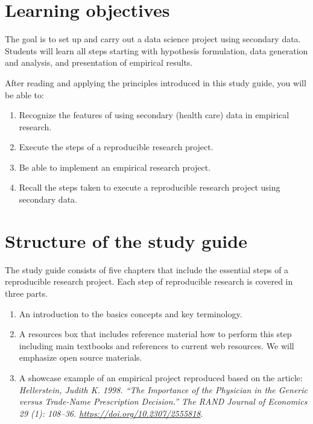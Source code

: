 \documentclass[
]{book}
\providecommand{\tightlist}{%
  \setlength{\itemsep}{0pt}\setlength{\parskip}{0pt}}
\begin{document}
\hypertarget{learning-objectives}{%
\section*{Learning objectives}\label{learning-objectives}}

The goal is to set up and carry out a data science project using
secondary data. Students will learn all steps starting with hypothesis
formulation, data generation and analysis, and presentation of empirical
results.

After reading and applying the principles introduced in this study
guide, you will be able to:

\begin{enumerate}
\def\labelenumi{\arabic{enumi}.}
\tightlist
\item
  Recognize the features of using secondary (health care) data in
  empirical research.
\item
  Execute the steps of a reproducible research project.
\item
  Be able to implement an empirical research project.
\item
  Recall the steps taken to execute a reproducible research project
  using secondary data.
\end{enumerate}

\hypertarget{structure-of-the-study-guide}{%
\section*{Structure of the study
guide}\label{structure-of-the-study-guide}}

The study guide consists of five chapters that include the essential
steps of a reproducible research project. Each step of reproducible
research is covered in three parts.

\begin{enumerate}
\def\labelenumi{\arabic{enumi}.}
\tightlist
\item
  An introduction to the basics concepts and key terminology.
\item
  A resources box that includes reference material how to perform this
  step including main textbooks and references to current web resources.
  We will emphasize open source materials.
\item
  A showcase example of an empirical project reproduced based on the
  article: \emph{Hellerstein, Judith K. 1998. ``The Importance of the
  Physician in the Generic versus Trade-Name Prescription Decision.''
  The RAND Journal of Economics 29 (1): 108--36.
  \url{https://doi.org/10.2307/2555818}}.
\end{enumerate}
\end{document}
